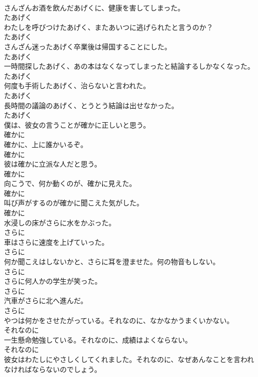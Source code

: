 \documentclass[8pt]{extreport}
\begin{document}
\begin{CJK}{UTF8}{min}
\\	さんざんお酒を飲んだあげくに、健康を害してしまった。	
\\	たあげく	
\\	わたしを呼びつけたあげく、またあいつに逃げられたと言うのか？	
\\	たあげく	
\\	さんざん迷ったあげく卒業後は帰国することにした。	
\\	たあげく	
\\	一時間探したあげく、あの本はなくなってしまったと結論するしかなくなった。	
\\	たあげく	
\\	何度も手術したあげく、治らないと言われた。	
\\	たあげく	
\\	長時間の議論のあげく、とうとう結論は出せなかった。	
\\	たあげく	
\\	僕は、彼女の言うことが確かに正しいと思う。	
\\	確かに	
\\	確かに、上に誰かいるぞ。	
\\	確かに	
\\	彼は確かに立派な人だと思う。	
\\	確かに	
\\	向こうで、何か動くのが、確かに見えた。	
\\	確かに	
\\	叫び声がするのが確かに聞こえた気がした。	
\\	確かに	
\\	水浸しの床がさらに水をかぶった。	
\\	さらに	
\\	車はさらに速度を上げていった。	
\\	さらに	
\\	何か聞こえはしないかと、さらに耳を澄ませた。何の物音もしない。	
\\	さらに	
\\	さらに何人かの学生が笑った。	
\\	さらに	
\\	汽車がさらに北へ進んだ。	
\\	さらに	
\\	やつは何かをさせたがっている。それなのに、なかなかうまくいかない。	
\\	それなのに	
\\	一生懸命勉強している。それなのに、成績はよくならない。	
\\	それなのに	
\\	彼女はわたしにやさしくしてくれました。それなのに、なぜあんなことを言われなければならないのでしょう。	

\end{CJK}
\end{document}

